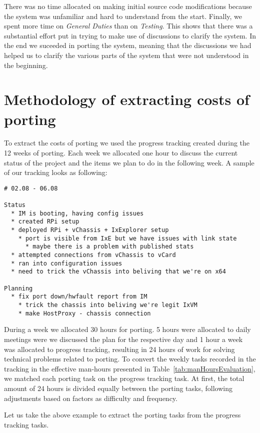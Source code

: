 There was no time allocated on making initial source code modifications because
the system was unfamiliar and hard to understand from the start. Finally, we
spent more time on \textit{General Duties} than on \textit{Testing}. This shows
that there was a substantial effort put in trying to make use of discussions
to clarify the system. In the end we suceeded in porting the system, meaning
that the discussions we had helped us to clarify the various parts of the system
that were not understood in the beginning.

\section{Methodology of extracting costs of porting}

To extract the costs of porting we used the progress tracking created during the
12 weeks of porting. Each week we allocated one hour to discuss the current
status of the project and the items we plan to do in the following week. A
sample of our tracking looks as following:

\begin{verbatim}
# 02.08 - 06.08

Status
  * IM is booting, having config issues
  * created RPi setup
  * deployed RPi + vChassis + IxExplorer setup
    * port is visible from IxE but we have issues with link state
      * maybe there is a problem with published stats
  * attempted connections from vChassis to vCard
  * ran into configuration issues
  * need to trick the vChassis into beliving that we're on x64

Planning
  * fix port down/hwfault report from IM
    * trick the chassis into beliving we're legit IxVM
    * make HostProxy - chassis connection
\end{verbatim}

During a week we allocated 30 hours for porting. 5 hours were allocated to daily
meetings were we discussed the plan for the respective day and 1 hour a week was
allocated to progress tracking, resulting in 24 hours of work for solving
technical problems related to porting. To convert the weekly tasks recorded in
the tracking in the effective man-hours presented
in Table~\ref{tab:manHoursEvaluation}, we matched each porting task on the
progress tracking task. At first, the total amount of 24 hours is divided
equally between the porting tasks, following adjustments based on factors as
difficulty and frequency.

Let us take the above example to extract the porting tasks from the progress
tracking tasks.


